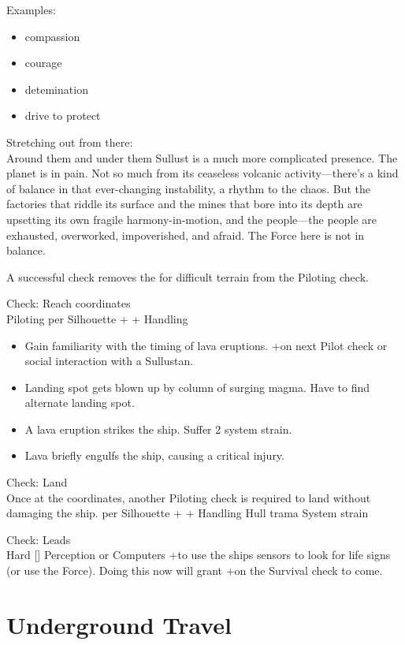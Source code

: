 \documentclass{book}
\newcommand{\df}{\difficulty}
\newcommand{\stb}{\setback}
\begin{document}
\begin{multicols}{2}
Examples:
\begin{itemize}
    \item compassion
    \item courage
    \item detemination
    \item drive to protect
\end{itemize}

Stretching out from there: \\
Around them and under them Sullust is a much more complicated presence. The planet is in pain. Not so much from its ceaseless volcanic activity—there’s a kind of balance in that ever-changing instability, a rhythm to the chaos. But the factories that riddle its surface and the mines that bore into its depth are upsetting its own fragile harmony-in-motion, and the people—the people are exhausted, overworked, impoverished, and afraid. The Force here is not in balance.

A successful check removes the \setback\setback\setback for difficult terrain from the Piloting check.

Check: Reach coordinates\\
Piloting \difficulty per Silhouette + \stb\stb\stb + Handling 

\begin{itemize}
	\item \advantage Gain familiarity with the timing of lava eruptions.  +\boost on next Pilot check or social interaction with a Sullustan.
	\item \failure Landing spot gets blown up by column of surging magma. Have to find alternate landing spot.
	\item \threat \threat A lava eruption strikes the ship.  Suffer 2 system strain.
	\item \despair Lava briefly engulfs the ship, causing a critical injury.
\end{itemize}


Check: Land\\
Once at the coordinates, another Piloting check is required to land without damaging the ship.
\difficulty per Silhouette + \stb\stb + Handling 
\failure Hull trama
\threat System strain

Check: Leads\\
Hard [\df\df\df] Perception or Computers +\setback to use the ships sensors to look for life signs (or use the Force). Doing this now will grant +\boost on the Survival check to come.

\section{Underground Travel}


\end{multicols}
\end{document}
